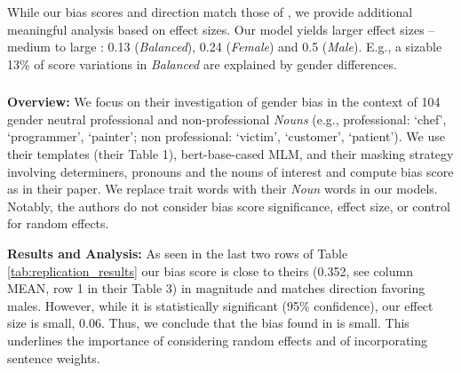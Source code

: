 While our bias scores and direction match those of \citet{bartl-etal-2020-unmasking}, we provide additional meaningful analysis based on effect sizes.
%
Our model yields larger effect sizes -- medium to large 
: 0.13 (\textit{Balanced}), 0.24 (\textit{Female}) and 0.5 (\textit{Male}). 
%
E.g., a sizable 13\% of score variations in \textit{Balanced} are explained by gender differences.

\subsubsection{\texorpdfstring{\citet{limisiewicz-marecek-2022-dont}}{}}
%

\noindent \textbf{Overview:}
%
We focus on their investigation of gender bias in the context of 104 gender neutral professional and non-professional \textit{Nouns} (e.g., professional: `chef', `programmer', `painter'; non professional: `victim', `customer', `patient').
%
We use their templates (their Table 1), bert-base-cased MLM, and 
their masking strategy involving determiners, pronouns and the nouns of interest and compute bias score as in their paper.
%
We replace trait words with their \textit{Noun} words in our models. 
%
Notably, the authors do not consider bias score significance, effect size, or control for random effects.

\vspace{0.5em} 
\noindent \textbf{Results and Analysis:} As seen in the last two rows of Table \ref{tab:replication_results} 
%
our bias score is close to theirs (0.352, see column MEAN, row 1 in their Table 3) in magnitude and matches direction favoring males.
%
However, while it is statistically significant (95\% confidence), our effect size is small, 0.06. Thus, we conclude that the bias found in
\citet{limisiewicz-marecek-2022-dont}
is small.
%
This underlines the importance of considering random effects and of incorporating sentence weights.


